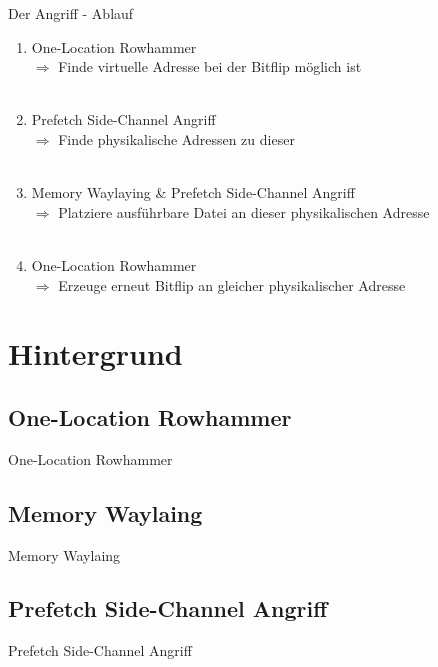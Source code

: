 \documentclass[german,10pt,xcolor=colortbl,compress
]{beamer}
\begin{document}
\begin{frame}{Der Angriff - Ablauf}

\begin{enumerate}
	\item One-Location Rowhammer\\
	$ \Rightarrow $ Finde virtuelle Adresse bei der Bitflip möglich ist\\~\\
	\pause
	\item Prefetch Side-Channel Angriff\\
	$ \Rightarrow $ Finde physikalische Adressen zu dieser\\~\\
	\pause
	\item Memory Waylaying \& Prefetch Side-Channel Angriff\\
	$ \Rightarrow $ Platziere ausführbare Datei an dieser physikalischen Adresse\\~\\
	\pause
	\item One-Location Rowhammer\\
	$ \Rightarrow $ Erzeuge erneut Bitflip an gleicher physikalischer Adresse
	
\end{enumerate}

\end{frame}


\section{Hintergrund}
\subsection{One-Location Rowhammer}
\begin{frame}{One-Location Rowhammer}

\end{frame}

\subsection{Memory Waylaing}
\begin{frame}{Memory Waylaing}
\end{frame}

\subsection{Prefetch Side-Channel Angriff}
\begin{frame}{Prefetch Side-Channel Angriff}

\end{frame}
\end{document}

